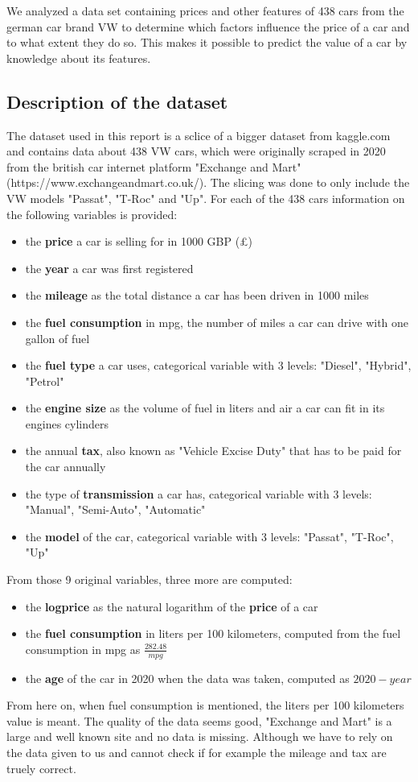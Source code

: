 \documentclass[12 pt]{scrartcl}
\begin{document}
We analyzed a data set containing prices and other features of 438 cars from the german car brand VW to determine which factors influence the price of a car and to what extent they do so. This makes it possible to predict the value of a car by knowledge about its features.

\subsection{Description of the dataset}

The dataset used in this report is a sclice of a bigger dataset from kaggle.com and contains data about 438 VW cars, which were originally scraped in 2020 from the british car internet platform "Exchange and Mart" \citep{Exchangeandmart}
(https://www.exchangeandmart.co.uk/). The slicing was done to only include the VW models "Passat", "T-Roc" and "Up".
For each of the 438 cars information on the following variables is provided:
\begin{itemize}
  \item the \textbf{price} a car is selling for in 1000 GBP (£)
  \item the \textbf{year} a car was first registered
  \item the \textbf{mileage} as the total distance a car has been driven in 1000 miles
  \item the \textbf{fuel consumption} in mpg, the number of miles a car can drive with one gallon of fuel
  \item the \textbf{fuel type} a car uses, categorical variable with 3 levels: "Diesel", "Hybrid", "Petrol"
  \item the \textbf{engine size} as the volume of fuel in liters and air a car can fit in its engines cylinders
  \item the annual \textbf{tax}, also known as "Vehicle Excise Duty" that has to be paid for the car annually
  \item the type of \textbf{transmission} a car has, categorical variable with 3 levels: "Manual", "Semi-Auto", "Automatic"
  \item the \textbf{model} of the car, categorical variable with 3 levels: "Passat", "T-Roc", "Up"
\end{itemize}
From those 9 original variables, three more are computed:
\begin{itemize}
  \item the \textbf{logprice} as the natural logarithm of the \textbf{price} of a car
  \item the \textbf{fuel consumption} in liters per 100 kilometers, computed from the fuel consumption in mpg as $\frac{282.48}{mpg}$
  \item the \textbf{age} of the car in 2020 when the data was taken, computed as $2020-year$
\end{itemize}
From here on, when fuel consumption is mentioned, the liters per 100 kilometers value is meant.
The quality of the data seems good, "Exchange and Mart" is a large and well known site and no data is missing. Although we have to rely on the data given to us and cannot check if for example the mileage and tax are truely correct.
\end{document}
